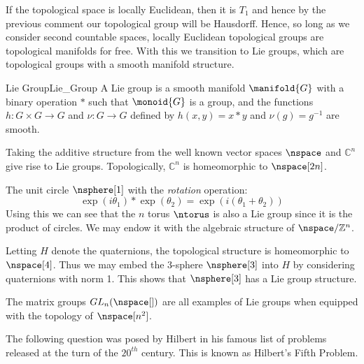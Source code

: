     If the topological space is locally Euclidean, then it is $T_{1}$
    and hence by the previous comment our topological group will be
    Hausdorff. Hence, so long as we consider second countable spaces,
    locally Euclidean topological groups are topological manifolds for
    free. With this we transition to Lie groups, which are topological
    groups with a smooth manifold structure.
    \begin{fdefinition}{Lie Group}{Lie_Group}
        A Lie group is a smooth manifold $\manifold{G}$ with a binary
        operation $*$ such that $\monoid{G}$ is a group, and the
        functions $h:G\times{G}\rightarrow{G}$ and $\nu:G\rightarrow{G}$
        defined by $h(x,y)=x*y$ and $\nu(g)=g^{\minus{1}}$ are smooth.
    \end{fdefinition}
    \begin{example}
        Taking the additive structure from the well known vector spaces
        $\nspace$ and $\mathbb{C}^{n}$ give rise to Lie groups.
        Topologically, $\mathbb{C}^{n}$ is homeomorphic to
        $\nspace[2n]$.
    \end{example}
    \begin{example}
        The unit circle $\nsphere[1]$ with the \textit{rotation}
        operation:
        \begin{equation}
            \exp(i\theta_{1})*\exp(\theta_{2})
                =\exp(i(\theta_{1}+\theta_{2}))
        \end{equation}
        Using this we can see that the $n$ torus $\ntorus$ is also a
        Lie group since it is the product of circles. We may endow it
        with the algebraic structure of $\nspace/\mathbb{Z}^{n}$.
    \end{example}
    \begin{example}
        Letting $H$ denote the quaternions, the topological structure is
        homeomorphic to $\nspace[4]$. Thus we may embed the 3-sphere
        $\nsphere[3]$ into $H$ by considering quaternions with norm 1.
        This shows that $\nsphere[3]$ has a Lie group structure.
    \end{example}
    \begin{example}
        The matrix groups $GL_{n}(\nspace[])$ are all examples of Lie
        groups when equipped with the topology of $\nspace[n^{2}]$.
    \end{example}
    The following question was posed by Hilbert in his famous list of
    problems released at the turn of the $20^{th}$ century. This is
    known as Hilbert's Fifth Problem.
